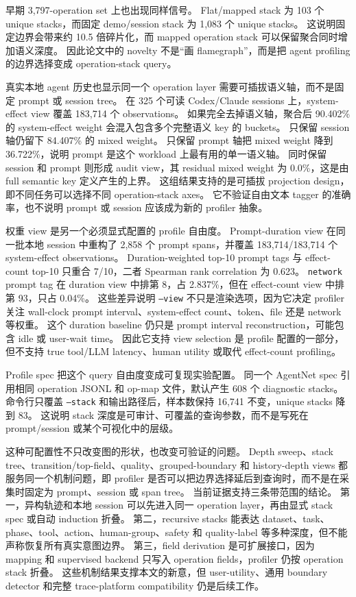 \documentclass[10pt,twocolumn]{ctexart}
\begin{document}
早期 3,797-operation set 上也出现同样信号。
Flat/mapped stack 为 103 个 unique stacks，而固定 demo/session stack 为 1,083 个 unique stacks。
这说明固定边界会带来约 10.5 倍碎片化，而 mapped operation stack 可以保留聚合同时增加语义深度。
因此论文中的 novelty 不是“画 flamegraph”，而是把 agent profiling 的边界选择变成 operation-stack query。

真实本地 agent 历史也显示同一个 operation layer 需要可插拔语义轴，而不是固定 prompt 或 session tree。
在 325 个可读 Codex/Claude sessions 上，system-effect view 覆盖 183,714 个 observations。
如果完全去掉语义轴，聚合后 90.402\% 的 system-effect weight 会混入包含多个完整语义 key 的 buckets。
只保留 session 轴仍留下 84.407\% 的 mixed weight。
只保留 prompt 轴把 mixed weight 降到 36.722\%，说明 prompt 是这个 workload 上最有用的单一语义轴。
同时保留 session 和 prompt 则形成 audit view，其 residual mixed weight 为 0.0\%，这是由 full semantic key 定义产生的上界。
这组结果支持的是可插拔 projection design，即不同任务可以选择不同 operation-stack axes。
它不验证自由文本 tagger 的准确率，也不说明 prompt 或 session 应该成为新的 profiler 抽象。

权重 view 是另一个必须显式配置的 profile 自由度。
Prompt-duration view 在同一批本地 session 中重构了 2,858 个 prompt spans，并覆盖 183,714/183,714 个 system-effect observations。
Duration-weighted top-10 prompt tags 与 effect-count top-10 只重合 7/10，二者 Spearman rank correlation 为 0.623。
\texttt{network} prompt tag 在 duration view 中排第 8，占 2.837\%，但在 effect-count view 中排第 93，只占 0.04\%。
这些差异说明 \texttt{--view} 不只是渲染选项，因为它决定 profiler 关注 wall-clock prompt interval、system-effect count、token、file 还是 network 等权重。
这个 duration baseline 仍只是 prompt interval reconstruction，可能包含 idle 或 user-wait time。
因此它支持 view selection 是 profile 配置的一部分，但不支持 true tool/LLM latency、human utility 或取代 effect-count profiling。

Profile spec 把这个 query 自由度变成可复现实验配置。
同一个 AgentNet spec 引用相同 operation JSONL 和 op-map 文件，默认产生 608 个 diagnostic stacks。
命令行只覆盖 \texttt{--stack} 和输出路径后，样本数保持 16,741 不变，unique stacks 降到 83。
这说明 stack 深度是可审计、可覆盖的查询参数，而不是写死在 prompt/session 或某个可视化中的层级。

这种可配置性不只改变图的形状，也改变可验证的问题。
Depth sweep、stack tree、transition/top-field、quality、grouped-boundary 和 history-depth views 都服务同一个机制问题，即 profiler 是否可以把边界选择延后到查询时，而不是在采集时固定为 prompt、session 或 span tree。
当前证据支持三条带范围的结论。
第一，异构轨迹和本地 session 可以先进入同一 operation layer，再由显式 stack spec 或自动 induction 折叠。
第二，recursive stacks 能表达 dataset、task、phase、tool、action、human-group、safety 和 quality-label 等多种深度，但不能声称恢复所有真实意图边界。
第三，field derivation 是可扩展接口，因为 mapping 和 supervised backend 只写入 operation fields，profiler 仍按 operation stack 折叠。
这些机制结果支撑本文的新意，但 user-utility、通用 boundary detector 和完整 trace-platform compatibility 仍是后续工作。
\end{document}
